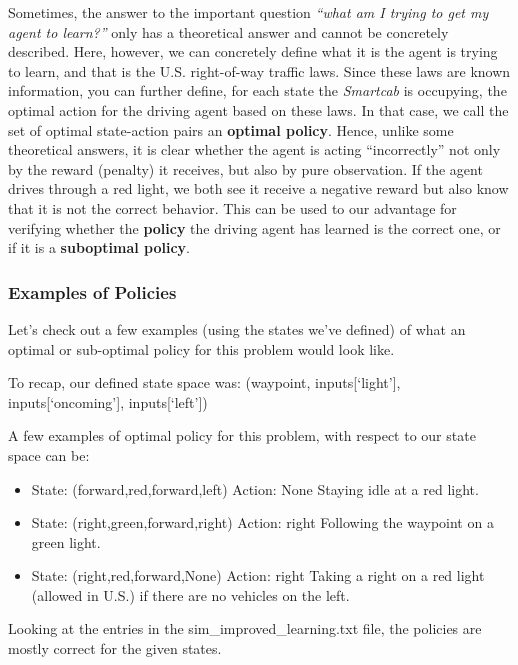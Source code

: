 \documentclass[11pt]{article}
\providecommand{\tightlist}{%
      \setlength{\itemsep}{0pt}\setlength{\parskip}{0pt}}
\begin{document}
Sometimes, the answer to the important question \emph{``what am I trying
to get my agent to learn?''} only has a theoretical answer and cannot be
concretely described. Here, however, we can concretely define what it is
the agent is trying to learn, and that is the U.S. right-of-way traffic
laws. Since these laws are known information, you can further define,
for each state the \emph{Smartcab} is occupying, the optimal action for
the driving agent based on these laws. In that case, we call the set of
optimal state-action pairs an \textbf{optimal policy}. Hence, unlike
some theoretical answers, it is clear whether the agent is acting
``incorrectly'' not only by the reward (penalty) it receives, but also
by pure observation. If the agent drives through a red light, we both
see it receive a negative reward but also know that it is not the
correct behavior. This can be used to our advantage for verifying
whether the \textbf{policy} the driving agent has learned is the correct
one, or if it is a \textbf{suboptimal policy}.

    \hypertarget{examples-of-policies}{%
\subsubsection{Examples of Policies}\label{examples-of-policies}}

Let's check out a few examples (using the states we've defined) of what
an optimal or sub-optimal policy for this problem would look like.

    To recap, our defined state space was: (waypoint, inputs{[}`light'{]},
inputs{[}`oncoming'{]}, inputs{[}`left'{]})

A few examples of optimal policy for this problem, with respect to our
state space can be:

\begin{itemize}
\tightlist
\item
  State: (forward,red,forward,left) \textbar{} Action: None \textbar{}
  Staying idle at a red light.
\item
  State: (right,green,forward,right) \textbar{} Action: right \textbar{}
  Following the waypoint on a green light.
\item
  State: (right,red,forward,None) \textbar{} Action: right \textbar{}
  Taking a right on a red light (allowed in U.S.) if there are no
  vehicles on the left.
\end{itemize}

Looking at the entries in the sim\_improved\_learning.txt file, the
policies are mostly correct for the given states.
\end{document}
